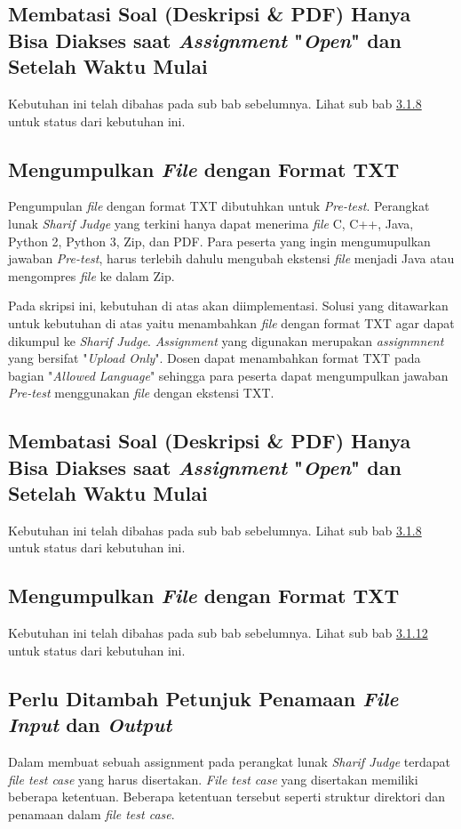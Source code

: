 \subsection{Membatasi Soal (Deskripsi \& PDF) Hanya Bisa Diakses saat \textit{Assignment} "\textit{Open}" dan Setelah Waktu Mulai}
Kebutuhan ini telah dibahas pada sub bab sebelumnya. Lihat sub bab \hyperref[subsec:membatasisoal]{3.1.8} untuk status dari kebutuhan ini.

\subsection{Mengumpulkan \textit{File} dengan Format TXT}
\label{subsec:filetxt}
Pengumpulan \textit{file} dengan format TXT dibutuhkan untuk \textit{Pre-test}. Perangkat lunak \textit{Sharif Judge} yang terkini hanya dapat menerima \textit{file} C, C++, Java, Python 2, Python 3, Zip, dan PDF. Para peserta yang ingin mengumupulkan jawaban \textit{Pre-test}, harus terlebih dahulu mengubah ekstensi \textit{file} menjadi Java atau mengompres \textit{file} ke dalam Zip. 

Pada skripsi ini, kebutuhan di atas akan diimplementasi. Solusi yang ditawarkan untuk kebutuhan di atas yaitu menambahkan \textit{file} dengan format TXT agar dapat dikumpul ke \textit{Sharif Judge}. \textit{Assignment} yang digunakan merupakan \textit{assignmnent} yang bersifat "\textit{Upload Only}". Dosen dapat menambahkan format TXT pada bagian "\textit{Allowed Language}" sehingga para peserta dapat mengumpulkan jawaban \textit{Pre-test} menggunakan \textit{file} dengan ekstensi TXT.

\subsection{Membatasi Soal (Deskripsi \& PDF) Hanya Bisa Diakses saat \textit{Assignment} "\textit{Open}" dan Setelah Waktu Mulai}
Kebutuhan ini telah dibahas pada sub bab sebelumnya. Lihat sub bab \hyperref[subsec:membatasisoal]{3.1.8} untuk status dari kebutuhan ini.

\subsection{Mengumpulkan \textit{File} dengan Format TXT}
Kebutuhan ini telah dibahas pada sub bab sebelumnya. Lihat sub bab \hyperref[subsec:filetxt]{3.1.12} untuk status dari kebutuhan ini.

\subsection{Perlu Ditambah Petunjuk Penamaan \textit{File} \textit{Input} dan \textit{Output}}
Dalam membuat sebuah assignment pada perangkat lunak \textit{Sharif Judge} terdapat \textit{file test case} yang harus disertakan. \textit{File test case} yang disertakan memiliki beberapa ketentuan. Beberapa ketentuan tersebut seperti struktur direktori dan penamaan dalam \textit{file test case}. 

